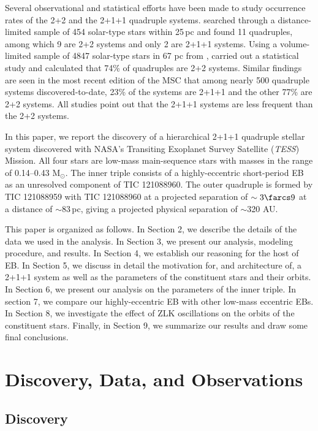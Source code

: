 \documentclass[fleqn,usenatbib]{mnras} %
\begin{document}
Several observational and statistical efforts have been made to study occurrence rates of the 2+2 and the 2+1+1 quadruple systems. \citet[][]{Raghavan2010} searched through a distance-limited sample of 454 solar-type stars within 25\,pc and found 11 quadruples, among which 9 are 2+2 systems and only 2 are 2+1+1 systems. Using a volume-limited sample of 4847 solar-type stars in 67 pc from \citet[][]{Tokovinin2014a}, \citet[][]{Tokovinin2014b} carried out a statistical study and calculated that 74\% of quadruples are 2+2 systems. Similar findings are seen in the most recent edition of the MSC that among nearly 500 quadruple systems discovered-to-date, 23\% of the systems are 2+1+1 and the other 77\% are 2+2 systems. All studies point out that the 2+1+1 systems are less frequent than the 2+2 systems.

In this paper, we report the discovery of a hierarchical 2+1+1 quadruple stellar system discovered with NASA's Transiting Exoplanet Survey Satellite ({\em TESS}) Mission. All four stars are low-mass main-sequence stars with masses in the range of 0.14--0.43 M$_\odot$. The inner triple consists of a highly-eccentric short-period EB as an unresolved component of TIC 121088960. The outer quadruple is formed by TIC 121088959 with TIC 121088960 at a projected separation of $\sim3\farcs9$ at a distance of $\sim83$\,pc, giving a projected physical separation of $\sim$320 AU.

This paper is organized as follows. In Section 2, we describe the details of the data we used in the analysis. In Section 3, we present our analysis, modeling procedure, and results. In Section 4, we establish our reasoning for the host of EB. In Section 5, we discuss in detail the motivation for, and architecture of, a 2+1+1 system as well as the parameters of the constituent stars and their orbits. In Section 6, we present our analysis on the parameters of the inner triple. In section 7, we compare our highly-eccentric EB with other low-mass eccentric EBs. In Section 8, we investigate the effect of ZLK oscillations on the orbits of the constituent stars. Finally, in Section 9, we summarize our results and draw some final conclusions.


\section{Discovery, Data, and Observations}

\subsection{Discovery}
\label{sec:discovery}
\end{document}
